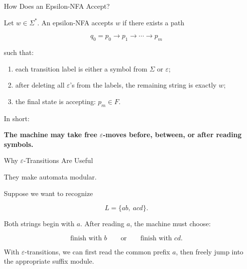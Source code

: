 \documentclass[10pt,aspectratio=169]{beamer}
\newcommand{\eps}{\varepsilon}
\begin{document}
\begin{frame}{How Does an Epsilon-NFA Accept?}

Let \(w\in\Sigma^*\). An epsilon-NFA accepts \(w\) if there exists a path

\[
q_0=p_0 \rightarrow p_1 \rightarrow \cdots \rightarrow p_m
\]

such that:

\begin{enumerate}
\item each transition label is either a symbol from \(\Sigma\) or \(\eps\);
\item after deleting all \(\eps\)'s from the labels, the remaining string is exactly \(w\);
\item the final state is accepting: \(p_m\in F\).
\end{enumerate}

\vspace{0.7em}

\pause
In short:

\begin{center}
\textbf{The machine may take free \(\eps\)-moves before, between, or after reading symbols.}
\end{center}

\end{frame}

\begin{frame}{Why \(\eps\)-Transitions Are Useful}

They make automata modular.

\vspace{0.8em}

Suppose we want to recognize

\[
L=\{ab,\ acd\}.
\]

\vspace{0.8em}

Both strings begin with \(a\). After reading \(a\), the machine must choose:

\[
\text{finish with } b
\qquad\text{or}\qquad
\text{finish with } cd.
\]

\vspace{0.8em}

With \(\eps\)-transitions, we can first read the common prefix \(a\), then freely jump into the appropriate suffix module.

\end{frame}
\end{document}
